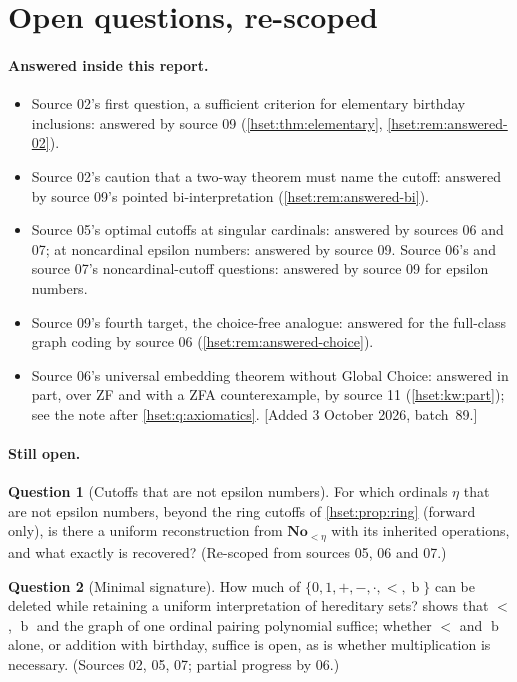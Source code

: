 \documentclass[11pt,letterpaper]{article}
\theoremstyle{definition}
\newtheorem{question}[question]{Question}\aliascntresetthe{question}
\theoremstyle{remark}
\newcommand{\No}{\mathbf{No}}
\newcommand{\bd}{\operatorname{b}}
\begin{document}
\section{Open questions, re-scoped}
\label{hset:sec:questions}

\paragraph{Answered inside this report.}
\begin{itemize}
\item Source 02's first question, a sufficient criterion for elementary
birthday inclusions: answered by source 09 (\cref{hset:thm:elementary},
\cref{hset:rem:answered-02}).
\item Source 02's caution that a two-way theorem must name the cutoff: answered
by source 09's pointed bi-interpretation (\cref{hset:rem:answered-bi}).
\item Source 05's optimal cutoffs at singular cardinals: answered by sources 06
and 07; at noncardinal epsilon numbers: answered by source 09. Source 06's and
source 07's noncardinal-cutoff questions: answered by source 09 for epsilon
numbers.
\item Source 09's fourth target, the choice-free analogue: answered for the
full-class graph coding by source 06 (\cref{hset:rem:answered-choice}).
\item Source 06's universal embedding theorem without Global Choice: answered in
part, over ZF and with a ZFA counterexample, by source 11 (\cref{hset:kw:part});
see the note after \cref{hset:q:axiomatics}. [Added 3 October 2026, batch~89.]\end{itemize}

\paragraph{Still open.}
\begin{question}[Cutoffs that are not epsilon numbers]
For which ordinals $\eta$ that are not epsilon numbers, beyond the ring cutoffs
of \cref{hset:prop:ring} (forward only), is there a uniform reconstruction from
$\No_{<\eta}$ with its inherited operations, and what exactly is recovered?
(Re-scoped from sources 05, 06 and 07.)
\end{question}

\begin{question}[Minimal signature]
How much of $\{0,1,+,-,\cdot,<,\bd\}$ can be deleted while retaining a uniform
interpretation of hereditary sets?  shows that $<$,
$\bd$ and the graph of one ordinal pairing polynomial suffice; whether $<$ and
$\bd$ alone, or addition with birthday, suffice is open, as is whether
multiplication is necessary. (Sources 02, 05, 07; partial progress by 06.)
\end{question}
\end{document}
